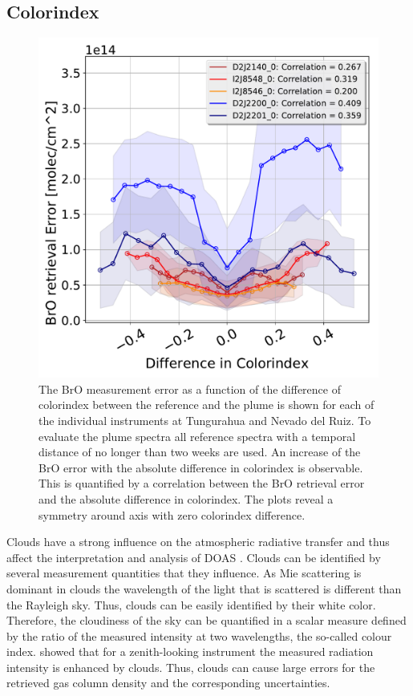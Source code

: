 \subsection{ Colorindex}
	\begin{figure}
	\centering
	\includegraphics[width=0.7\linewidth]{Bilder/DiffColidxallInstruments}
	\caption{The BrO measurement error as a function of the difference of colorindex between the reference and the plume is shown for each of the individual instruments at Tungurahua and Nevado del Ruiz. To evaluate the plume spectra all reference spectra with a temporal distance of no longer than two weeks are used. An increase of the BrO error with the absolute difference in colorindex is observable. This is quantified by a correlation between the BrO retrieval error and the absolute difference in colorindex. The plots reveal a symmetry around axis with zero colorindex difference. }
	\label{fig:diffcolidx}
\end{figure}
Clouds  have  a  strong  influence  on  the  atmospheric  radiative  transfer  and  thus  affect  the  interpretation  and  analysis of DOAS \citep{wagner2014cloud}.
Clouds can be identified by several measurement quantities that they influence.
As Mie scattering is dominant in clouds the wavelength of the light that is scattered is different than the Rayleigh sky. Thus, clouds can be easily identified by their white color.
Therefore, the cloudiness of the sky can be quantified in a scalar measure defined by the ratio of the measured intensity at two wavelengths, the so-called colour index.
\cite{wagner2014cloud} showed that for a zenith-looking instrument the measured radiation intensity is enhanced by clouds. Thus, clouds can cause large errors for the retrieved gas column density and the corresponding uncertainties. 
